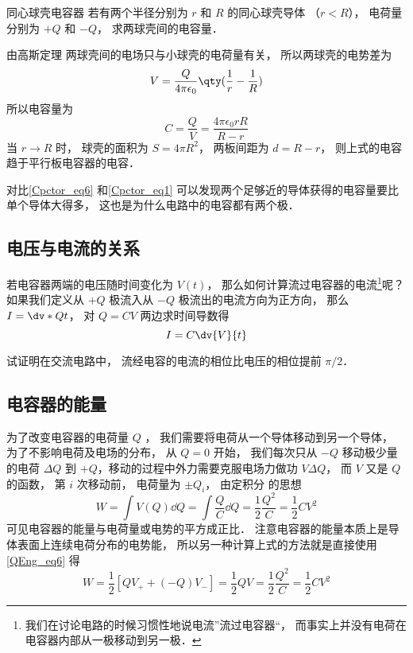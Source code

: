 \begin{example}{同心球壳电容器}
若有两个半径分别为 $r$ 和 $R$ 的同心球壳导体 （$r < R$）， 电荷量分别为 $+Q$ 和 $-Q$， 求两球壳间的电容量．

由高斯定理%
两球壳间的电场只与小球壳的电荷量有关， 所以两球壳的电势差为
\begin{equation}
V = \frac{Q}{4\pi\epsilon_0} \qty(\frac 1r - \frac 1R)
\end{equation}
所以电容量为
\begin{equation}\label{Cpctor_eq6}
C = \frac QV = \frac{4\pi\epsilon_0 rR}{R - r}
\end{equation}
当 $r\to R$ 时， 球壳的面积为 $S = 4\pi R^2$， 两板间距为 $d = R - r$， 则上式的电容趋于平行板电容器的电容．
\end{example}

对比\autoref{Cpctor_eq6} 和\autoref{Cpctor_eq1} 可以发现两个足够近的导体获得的电容量要比单个导体大得多， 这也是为什么电路中的电容都有两个极．

\subsection{电压与电流的关系}
若电容器两端的电压随时间变化为 $V(t)$， 那么如何计算流过电容器的电流\footnote{我们在讨论电路的时候习惯性地说电流”流过电容器“， 而事实上并没有电荷在电容器内部从一极移动到另一极．}呢？ 如果我们定义从 $+Q$ 极流入从 $-Q$ 极流出的电流方向为正方向， 那么 $I = \dv*{Q}{t}$， 对 $Q = CV$ 两边求时间导数得
\begin{equation}
I = C\dv{V}{t}
\end{equation}
\begin{exercise}{}
试证明在交流电路中， 流经电容的电流的相位比电压的相位提前 $\pi/2$．
\end{exercise}

\subsection{电容器的能量}
为了改变电容器的电荷量 $Q$ ， 我们需要将电荷从一个导体移动到另一个导体， 为了不影响电荷及电场的分布， 从 $Q = 0$ 开始， 我们每次只从 $-Q$ 移动极少量的电荷 $\Delta Q$ 到 $+Q$，移动的过程中外力需要克服电场力做功 $V\Delta Q$， 而 $V$ 又是 $Q$ 的函数， 第 $i$ 次移动前， 电荷量为 $\pm Q_i$， 由定积分 的思想
\begin{equation}
W = \int V(Q) \dd{Q} = \int \frac{Q}{C} \dd{Q} = \frac12 \frac{Q^2}{C} = \frac12 CV^2
\end{equation}
可见电容器的能量与电荷量或电势的平方成正比． 注意电容器的能量本质上是导体表面上连续电荷分布的电势能， 所以另一种计算上式的方法就是直接使用\autoref{QEng_eq6} 得
\begin{equation}
W = \frac12 [QV_+ + (-Q)V_-] = \frac12 QV = \frac12 \frac{Q^2}{C} = \frac12 CV^2 
\end{equation}


